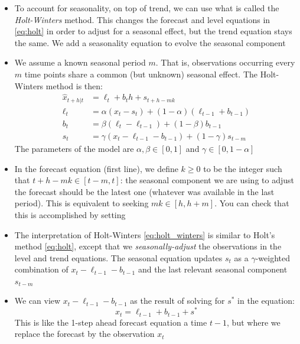 \documentclass{article}
\begin{document}
\begin{itemize}
\item To account for seasonality, on top of trend, we can use what is called the   
  \emph{Holt-Winters} method. This changes the forecast and level equations in
  \eqref{eq:holt} in order to adjust for a seasonal effect, but the trend
  equation stays the same. We add a seasonality equation to evolve the seasonal
  component    

\item We assume a known seasonal period $m$. That is, observations occurring
  every $m$ time points share a common (but unknown) seasonal effect. The
  Holt-Winters method is then:  
  \begin{equation}
  \label{eq:holt_winters}
  \begin{aligned}
  \hat{x}_{t+h | t} &= \ell_t + b_t h + s_{t+h-mk} \\  
  \ell_t &= \alpha (x_t - s_t) + (1-\alpha) (\ell_{t-1} + b_{t-1}) \\ 
  b_t &= \beta (\ell_t - \ell_{t-1}) + (1-\beta) b_{t-1} \\
  s_t &= \gamma (x_t - \ell_{t-1} - b_{t-1}) + (1-\gamma) s_{t-m} 
  \end{aligned}
  \end{equation}
  The parameters of the model are $\alpha, \beta \in [0,1]$ and $\gamma \in [0,
  1-\alpha]$ 

\item In the forecast equation (first line), we define $k \geq 0$ to be the
  integer such that $t+h-mk \in [t-m, t]$: the seasonal component we are using
  to adjust the forecast should be the latest one (whatever was available in the
  last period). This is equivalent to seeking $mk \in [h, h+m]$. You can check
  that this is accomplished by setting  

\item The interpretation of Holt-Winters \eqref{eq:holt_winters} is similar to 
  Holt's method \eqref{eq:holt}, except that we \emph{seasonally-adjust} the 
  observations in the level and trend equations. The seasonal equation updates
  $s_t$ as a $\gamma$-weighted combination of $x_t - \ell_{t-1} -  b_{t-1}$ and
  the last relevant seasonal component $s_{t-m}$ 

\item We can view $x_t - \ell_{t-1} -  b_{t-1}$ as the result of solving for $s^*$
  in the equation:    
  \[
  x_t = \ell_{t-1} + b_{t-1} + s^*
  \]
  This is like the 1-step ahead forecast equation a time $t-1$, but where we
  replace the forecast  by the observation $x_t$ 


\end{itemize}
\end{document}

